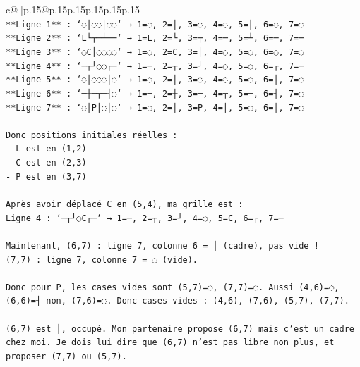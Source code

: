 \documentclass{article}
\begin{document}
{\begin{supertabular}{c@{$\;$}|p{.15\linewidth}@{}p{.15\linewidth}p{.15\linewidth}p{.15\linewidth}p{.15\linewidth}p{.15\linewidth}}
{{{\\ 
\texttt{**Ligne 1** : `◌│◌◌│◌◌` → 1=◌, 2=│, 3=◌, 4=◌, 5=│, 6=◌, 7=◌} \\
\texttt{**Ligne 2** : `L└┬─┴──` → 1=L, 2=└, 3=┬, 4=─, 5=┴, 6=─, 7=─} \\
\texttt{**Ligne 3** : `◌C│◌◌◌◌` → 1=◌, 2=C, 3=│, 4=◌, 5=◌, 6=◌, 7=◌} \\
\texttt{**Ligne 4** : `─┬┘◌◌┌─` → 1=─, 2=┬, 3=┘, 4=◌, 5=◌, 6=┌, 7=─} \\
\texttt{**Ligne 5** : `◌│◌◌◌│◌` → 1=◌, 2=│, 3=◌, 4=◌, 5=◌, 6=│, 7=◌} \\
\texttt{**Ligne 6** : `─┼─┬─┤◌` → 1=─, 2=┼, 3=─, 4=┬, 5=─, 6=┤, 7=◌} \\
\texttt{**Ligne 7** : `◌│P│◌│◌` → 1=◌, 2=│, 3=P, 4=│, 5=◌, 6=│, 7=◌} \\
\\ 
\texttt{Donc positions initiales réelles :} \\
\texttt{{-} L est en (1,2)} \\
\texttt{{-} C est en (2,3)} \\
\texttt{{-} P est en (3,7)} \\
\\ 
\texttt{Après avoir déplacé C en (5,4), ma grille est :} \\
\texttt{Ligne 4 : `─┬┘◌C┌─` → 1=─, 2=┬, 3=┘, 4=◌, 5=C, 6=┌, 7=─} \\
\\ 
\texttt{Maintenant, (6,7) : ligne 7, colonne 6 = │ (cadre), pas vide !} \\
\texttt{(7,7) : ligne 7, colonne 7 = ◌ (vide).} \\
\\ 
\texttt{Donc pour P, les cases vides sont (5,7)=◌, (7,7)=◌. Aussi (4,6)=◌, (6,6)=┤ non, (7,6)=◌. Donc cases vides : (4,6), (7,6), (5,7), (7,7).} \\
\\ 
\texttt{(6,7) est │, occupé. Mon partenaire propose (6,7) mais c'est un cadre chez moi. Je dois lui dire que (6,7) n'est pas libre non plus, et proposer (7,7) ou (5,7).} \\
            }
        }
    }
     \\ \\


\end{supertabular}}
\end{document}

